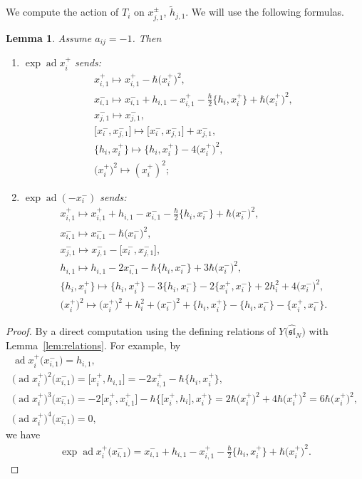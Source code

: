 \documentclass[pdftex]{sigma}
\newtheorem{lem}[thm]{Lemma}
\theoremstyle{definition}
\numberwithin{equation}{section}
\DeclareMathOperator{\ad}{ad}
\newcommand{\affY}{Y\big(\affsl\big)}
\newcommand{\affsl}{\hat{\mathfrak{sl}}_N}
\begin{document}
We compute the action of $T_i$ on $x_{j,1}^{\pm}$, $\tilde{h}_{j,1}$. We will use the following formulas.
\begin{lem}\label{lem:expad2}Assume $a_{ij}=-1$. Then
\begin{enumerate}\itemsep=0pt
\item $\exp\ad x_{i}^{+}$ sends:
\begin{gather*}
x_{i,1}^+ \mapsto x_{i,1}^+-\hbar \big(x_i^+\big)^2,\\
x_{i,1}^- \mapsto x_{i,1}^- + h_{i,1}-x_{i,1}^+ -\tfrac{\hbar}{2}\big\{ h_i, x_i^+\big\} + \hbar \big(x_i^+\big)^2,\\
x_{j,1}^- \mapsto x_{j,1}^-,\\
\big[x_i^-,x_{j,1}^-\big] \mapsto \big[x_i^-,x_{j,1}^-\big]+x_{j,1}^-,\\
\big\{h_i,x_i^+\big\} \mapsto \big\{h_i,x_i^+\big\} - 4\big(x_i^+\big)^2,\\
\big(x_i^+\big)^2 \mapsto (x_i^+)^2;
\end{gather*}
\item $\exp\ad (-x_{i}^{-})$ sends:
\begin{gather*}
x_{i,1}^+ \mapsto x_{i,1}^+ + h_{i,1}-x_{i,1}^- -\tfrac{\hbar}{2}\big\{ h_i, x_i^-\big\} + \hbar \big(x_i^-\big)^2,\\
x_{i,1}^- \mapsto x_{i,1}^- - \hbar\big(x_i^-\big)^2,\\
x_{j,1}^- \mapsto x_{j,1}^- - \big[x_i^-,x_{j,1}^-\big],\\
h_{i,1} \mapsto h_{i,1} - 2x_{i,1}^- - \hbar\big\{ h_i, x_i^- \big\} + 3\hbar \big(x_i^-\big)^2,\\
\big\{h_i,x_i^+\big\} \mapsto \big\{h_i,x_i^+\big\} - 3\big\{h_i,x_i^-\big\} - 2\big\{x_i^+,x_i^-\big\} + 2h_i^2 + 4\big(x_i^-\big)^2,\\
\big(x_i^+\big)^2 \mapsto \big(x_i^+\big)^2 + h_i^2 + \big(x_i^-\big)^2+ \big\{h_i,x_i^+\big\} - \big\{h_i,x_i^-\big\} - \big\{x_i^+,x_i^-\big\}.
\end{gather*}
\end{enumerate}
\end{lem}
\begin{proof}By a direct computation using the defining relations of $\affY$ with Lemma~\ref{lem:relations}. For example, by
\begin{gather*}
\ad x_i^{+} \big(x_{i,1}^-\big) = h_{i,1}, \\
\big(\ad x_i^{+}\big)^2 \big(x_{i,1}^-\big) = \big[x_i^+,h_{i,1}\big] = -2x_{i,1}^+ - \hbar \big\{h_i,x_i^+\big\}, \\
\big(\ad x_i^{+}\big)^3 \big(x_{i,1}^-\big) = -2 \big[x_i^+, x_{i,1}^+\big] - \hbar \big\{\big[x_i^+,h_i\big],x_i^+\big\} = 2\hbar\big(x_i^+\big)^2 + 4\hbar \big(x_i^+\big)^2 = 6\hbar\big(x_i^+\big)^2, \\
\big(\ad x_i^{+}\big)^4 \big(x_{i,1}^-\big)=0,
\end{gather*}
we have
\begin{gather*}
\exp\ad x_i^+ \big(x_{i,1}^-\big) = x_{i,1}^- + h_{i,1} - x_{i,1}^+ - \tfrac{\hbar}{2} \big\{h_i,x_i^+\big\} + \hbar\big(x_i^+\big)^2.\tag*{\qed}
\end{gather*}\renewcommand{\qed}{}
\end{proof}
\end{document}
